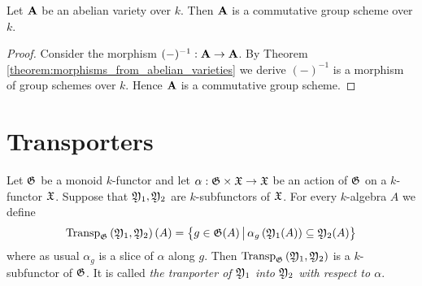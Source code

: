 \begin{corollary}\label{corollary:abelian_varieties_are_commutative}
Let $\mathbf{A}$ be an abelian variety over $k$. Then $\mathbf{A}$ is a commutative group scheme over $k$.
\end{corollary}
\begin{proof}
Consider the morphism $(-)^{-1}:\mathbf{A}\rightarrow \mathbf{A}$. By Theorem \ref{theorem:morphisms_from_abelian_varieties} we derive $(-)^{-1}$ is a morphism of group schemes over $k$. Hence $\mathbf{A}$ is a commutative group scheme.
\end{proof}

\section{Transporters}

\begin{definition}
Let ${\mathfrak G}$ be a monoid $k$-functor and let $\alpha:{\mathfrak G}\times {\mathfrak X}\rightarrow {\mathfrak X}$ be an action of ${\mathfrak G}$ on a $k$-functor ${\mathfrak X}$. Suppose that ${\mathfrak Y}_1,{\mathfrak Y}_2$ are $k$-subfunctors of ${\mathfrak X}$. For every $k$-algebra $A$ we define
$$\mathrm{Transp}_{{\mathfrak G}}\left({\mathfrak Y}_1,{\mathfrak Y}_2\right)(A) = \big\{g\in {\mathfrak G}(A)\,\big|\,\alpha_g\left({\mathfrak Y}_1(A)\right)\subseteq {\mathfrak Y}_2(A)\big\}$$
where as usual $\alpha_g$ is a slice of $\alpha$ along $g$. Then $\mathrm{Transp}_{{\mathfrak G}}\left({\mathfrak Y}_1,{\mathfrak Y}_2\right)$ is a $k$-subfunctor of ${\mathfrak G}$. It is called \textit{the tranporter of ${\mathfrak Y}_1$ into ${\mathfrak Y}_2$ with respect to $\alpha$}. 
\end{definition}





















































\small







